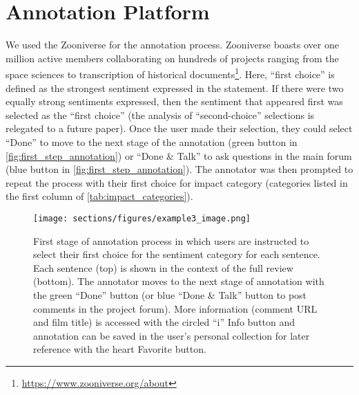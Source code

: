\section{Annotation Platform}
We used the Zooniverse for the annotation process. 
Zooniverse boasts over one million active members collaborating on hundreds of projects ranging from the space sciences to transcription of historical documents\footnote{\url{https://www.zooniverse.org/about}}. 
Here, ``first choice'' is defined as the strongest sentiment expressed in the statement. If there were two equally strong sentiments expressed, then the sentiment that appeared first was selected as the ``first choice'' (the analysis of ``second-choice'' selections is relegated to a future paper).
Once the user made their selection, they could select ``Done'' to move to the next stage of the annotation (green button in \autoref{fig:first_step_annotation}) or ``Done \& Talk'' to ask questions in the main forum (blue button in \autoref{fig:first_step_annotation}).
The annotator was then prompted to repeat the process with their first choice for impact category (categories listed in the first column of \autoref{tab:impact_categories}).

\begin{figure*}[t]
\centering
\texttt{[image: sections/figures/example3\_image.png]} 
\caption{First stage of annotation process in which users are instructed to select their first choice for the sentiment category for each sentence. Each sentence (top) is shown in the context of the full review (bottom). The annotator moves to the next stage of annotation with the green ``Done'' button (or blue ``Done \& Talk'' button to post comments in the project forum).  More information (comment URL and film title) is accessed with the circled ``i'' Info button and annotation can be saved in the user's personal collection for later reference with the heart Favorite button.}
\label{fig:first_step_annotation}
\end{figure*}


